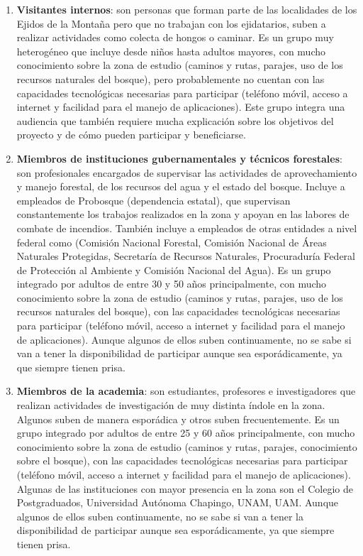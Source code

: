 \begin{enumerate}
    \item \textbf{Visitantes internos}: son personas que forman parte de las localidades de los Ejidos de la Montaña pero que no trabajan con los ejidatarios, suben a realizar actividades como colecta de hongos o caminar. Es un grupo muy heterogéneo que incluye desde niños hasta adultos mayores, con mucho conocimiento sobre la zona de estudio (caminos y rutas, parajes, uso de los recursos naturales del bosque), pero probablemente no cuentan con las capacidades tecnológicas necesarias para participar (teléfono móvil, acceso a internet y facilidad para el manejo de aplicaciones).  Este grupo integra una audiencia que también requiere mucha explicación sobre los objetivos del proyecto y de cómo pueden participar y beneficiarse.
    \item \textbf{Miembros de instituciones gubernamentales y técnicos forestales}: son profesionales encargados de supervisar las actividades de aprovechamiento y manejo forestal, de los recursos del agua y el estado del bosque. Incluye a empleados de Probosque (dependencia estatal), que supervisan constantemente los trabajos realizados en la zona y apoyan en las labores de combate de incendios. También incluye a empleados de otras entidades a nivel federal como (Comisión Nacional Forestal, Comisión Nacional de Áreas Naturales Protegidas, Secretaría de Recursos Naturales, Procuraduría Federal de Protección al Ambiente y Comisión Nacional del Agua). Es un grupo integrado por adultos de entre 30 y 50 años principalmente, con mucho conocimiento sobre la zona de estudio (caminos y rutas, parajes, uso de los recursos naturales del bosque), con las capacidades tecnológicas necesarias para participar (teléfono móvil, acceso a internet y facilidad para el manejo de aplicaciones).  Aunque algunos de ellos suben continuamente, no se sabe si van a tener la disponibilidad de participar aunque sea esporádicamente, ya que siempre tienen prisa.
    \item \textbf{Miembros de la academia}: son estudiantes, profesores e investigadores que realizan actividades de investigación de muy distinta índole en la zona. Algunos suben de manera esporádica y otros suben frecuentemente. Es un grupo integrado por adultos de entre 25 y 60 años principalmente, con mucho conocimiento sobre la zona de estudio (caminos y rutas, parajes, conocimiento sobre el bosque), con las capacidades tecnológicas necesarias para participar (teléfono móvil, acceso a internet y facilidad para el manejo de aplicaciones). Algunas de las instituciones con mayor presencia en la zona son el Colegio de Postgraduados, Universidad Autónoma Chapingo, UNAM, UAM. Aunque algunos de ellos suben continuamente, no se sabe si van a tener la disponibilidad de participar aunque sea esporádicamente, ya que siempre tienen prisa.
\end{enumerate}





